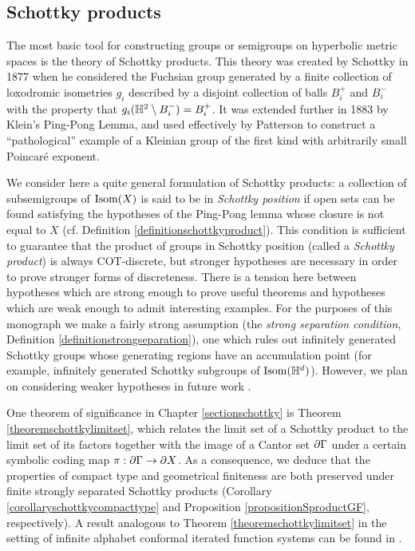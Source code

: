 \subsection{Schottky products}
The most basic tool for constructing groups or semigroups on hyperbolic metric spaces is the theory of Schottky products. This theory was created by Schottky in 1877 when he considered the Fuchsian group generated by a finite collection of loxodromic isometries $g_i$ described by a disjoint collection of balls $B_{i}^+$ and $B_{i}^-$ with the property that $g_i(\H^2\butnot B_{i}^-) = B_{i}^+$. It was extended further in 1883 by Klein's Ping-Pong Lemma, and used effectively by Patterson \cite{Patterson3} to construct a ``pathological'' example of a Kleinian group of the first kind with arbitrarily small Poincar\'e exponent.

We consider here a quite general formulation of Schottky products: a collection of subsemigroups of $\operatorname{Isom}(X)$ is said to be in \emph{Schottky position} if open sets can be found satisfying the hypotheses of the Ping-Pong lemma whose closure is not equal to $X$ (cf. Definition \ref{definitionschottkyproduct}). This condition is sufficient to guarantee that the product of groups in Schottky position (called a \emph{Schottky product}) is always COT-discrete, but stronger hypotheses are necessary in order to prove stronger forms of discreteness. There is a tension here between hypotheses which are strong enough to prove useful theorems and hypotheses which are weak enough to admit interesting examples. For the purposes of this monograph we make a fairly strong assumption (the \emph{strong separation condition}, Definition \ref{definitionstrongseparation}), one which rules out infinitely generated Schottky groups whose generating regions have an accumulation point (for example, infinitely generated Schottky subgroups of $\Isom(\H^d)$). However, we plan on considering weaker hypotheses in future work \cite{DSU2}.

One theorem of significance in Chapter \ref{sectionschottky} is Theorem \ref{theoremschottkylimitset}, which relates the limit set of a Schottky product to the limit set of its factors together with the image of a Cantor set $\partial\Gamma$ under a certain symbolic coding map $\pi:\partial\Gamma\to\partial X$. As a consequence, we deduce that the properties of compact type and geometrical finiteness are both preserved under finite strongly separated Schottky products (Corollary \ref{corollaryschottkycompacttype} and Proposition \ref{propositionSproductGF}, respectively). A result analogous to Theorem \ref{theoremschottkylimitset} in the setting of infinite alphabet conformal iterated function systems can be found in \cite[Lemma 2.1]{MauldinUrbanski1}.

